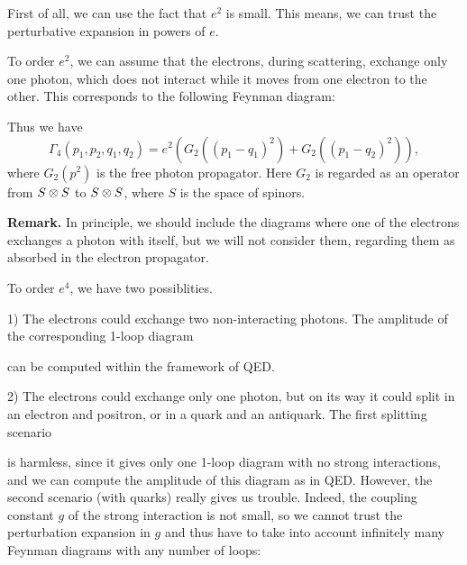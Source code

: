 \documentclass[11pt]{article}
\begin{document}
First of all, we can use the fact that $e^2$ is small. 
This means, we can trust the perturbative expansion in powers of $e$. 

To order $e^2$, we can assume
that the electrons, during scattering, exchange only one photon,
which does not interact while it moves from one electron to the other. 
This corresponds to the following Feynman diagram:

\begin{center}
\end{center}

Thus we have 
$$
\Gamma_4(p_1,p_2,q_1,q_2)=e^2(G_2((p_1-q_1)^2)+G_2((p_1-q_2)^2)),
$$
where $G_2(p^2)$ is the free photon propagator.
Here $G_2$ is regarded as an operator from $S\otimes S$ to
$S\otimes S$, where $S$ is the space of spinors. 

{\bf Remark.} In principle, we should include the diagrams where 
one of the electrons exchanges a photon with itself, 
but we will not consider them, regarding them as absorbed in
the electron propagator. 

To order $e^4$, we have two possiblities. 

1) The electrons could exchange 
two non-interacting photons. The amplitude of the corresponding 
1-loop diagram 

\begin{center}
\end{center}

can be computed within the framework of QED. 

2) The electrons could exchange only one photon, 
but on its way it could split in an electron and positron, 
 or in a quark and an antiquark. The first splitting scenario

\begin{center}
\end{center}

is harmless, since it gives only one 1-loop diagram
with no strong interactions, and we can compute the amplitude 
of this diagram as in QED. However, the second scenario (with quarks) 
really gives us trouble. Indeed, the coupling constant
$g$ of the strong interaction is not small, so we 
cannot trust the perturbation expansion in $g$ and thus
have to take into account 
infinitely many Feynman diagrams with any number of loops:

\begin{center}
\end{center}
\end{document}

